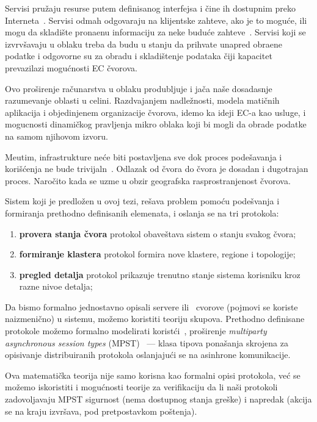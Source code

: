 Servisi pru\v zaju resurse putem definisanog interfejsa i \v cine ih dostupnim preko Interneta~\cite {JinCJL14}. Servisi odmah odgovaraju na klijentske zahteve, ako je to mogu\'ce, ili mogu da skladi\v ste prona\dj enu informaciju za neke budu\'ce zahteve~\cite {SatyanarayananBCD09, YaoXWYZP20}. Servisi koji se izvrv\v savaju u oblaku treba da budu u stanju da prihvate unapred obra\dj ene podatke i odgovorne su za obradu i skladi\v stenje podataka \v ciji kapacitet prevazilazi mogu\'cnosti EC \v cvorova.

Ovo pro\v sirenje ra\v cunarstva u oblaku produbljuje i ja\v ca na\v se dosadasnje razumevanje oblasti u celini. Razdvajanjem nadle\v znosti, modela mati\v cnih aplikacija i objedinjenem organizacije \v cvorova, idemo ka ideji EC-a kao usluge, i mogucnosti dinami\v ckog pravljenja mikro oblaka koji bi mogli da obrade podatke na samom njihovom izvoru.

Me\dj utim, infrastrukture ne\'ce biti postavljena sve dok proces pode\v savanja i kori\v s\'cenja ne bude trivijaln~\cite{SatyanarayananBCD09}. Odlazak od \v cvora do \v cvora je dosadan i dugotrajan proces. Naro\v cito kada se uzme u obzir geografska rasprostranjenost \v cvorova. 

Sistem koji je predlo\v zen u ovoj tezi, re\v sava problem pomo\'cu  pode\v svanja i formiranja prethodno definisanih elemenata, i oslanja se na tri protokola:

\begin{enumerate}[start=1,label={(\bfseries \arabic*)}]
	\item \textbf{provera stanja \v cvora} protokol obave\v stava sistem o stanju svakog \v cvora; 
	\item \textbf{formiranje klastera} protokol formira nove klastere, regione i topologije;  
	\item \textbf{pregled detalja} protokol prikazuje trenutno stanje sistema korisniku kroz razne nivoe detalja;
\end{enumerate}

Da bismo formalno jednostavno opisali servere ili \ cvorove (pojmovi se koriste naizmeni\v cno) u sistemu, mo\v zemo koristiti teoriju skupova. Prethodno definisane protokole mo\v zemo formalno modelirati korist\'ci~\cite {HuY17}, pro\v sirenje \emph{multiparty asynchronous session types} (MPST)~\cite {HondaYC08} --- klasa tipova pona\v sanja skrojena za opisivanje distribuiranih protokola oslanjaju\'ci se na asinhrone komunikacije.

Ova matemati\v cka teorija nije samo korisna kao formalni opisi protokola, ve\'c se mo\v zemo iskoristiti i mogu\'cnosti teorije za verifikaciju da li na\v si protokoli zadovoljavaju MPST sigurnost (nema dostupnog stanja gre\v ske) i napredak (akcija se na kraju izvr\v sava, pod pretpostavkom po\v stenja). 

